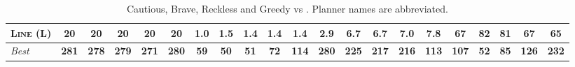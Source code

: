 \documentclass[11pt,landscape]{article}
\begin{document}
\begin{table}[tb]
{\begin{tabular}{|l||ccccc||ccccc||ccccc||ccccc||}
\textsc{Line} (L)&\textbf{20}&\textbf{20}&\textbf{20}&\textbf{20}&\textbf{20}&\textbf{1.0}&1.5&1.4&1.4&1.4&\textbf{2.9}&6.7&6.7&7.0&7.8&67&82&81&67&\textbf{65}
\\\hline
\textit{Best}&\textbf{281}&\textbf{278}&\textbf{279}&\textbf{271}&\textbf{280}&\textbf{59}&\textbf{50}&\textbf{51}&\textbf{72}&\textbf{114}&\textbf{280}&\textbf{225}&\textbf{217}&\textbf{216}&\textbf{113}&\textbf{107}&\textbf{52}&\textbf{85}&\textbf{126}&\textbf{232}\\\hline

        \end{tabular}}
        \caption{Cautious, Brave, Reckless and Greedy \pattyd vs \pattyo. Planner names are abbreviated.}
        \label{tab:cbrg}
        \end{table}
        
\end{document}
